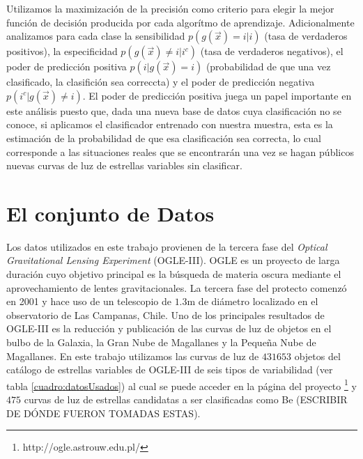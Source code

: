 \documentclass[letterpaper,12pt]{book}
\begin{document}
Utilizamos la maximización de la precisión como criterio para elegir la mejor función de decisión producida por cada algorítmo de aprendizaje. Adicionalmente analizamos para cada clase la sensibilidad $p(g(\vec{x})=i|i)$ (tasa de verdaderos positivos),  la especificidad $p(g(\vec{x})\neq i|i^c)$ (tasa de verdaderos negativos), el poder de predicción positiva $p(i|g(\vec{x})=i)$ (probabilidad de que una vez clasificado, la clasifición sea correccta) y el poder de predicción negativa $p(i^c|g(\vec{x})\neq i)$. El poder de predicción positiva juega un papel importante en este análisis puesto que, dada una nueva base de datos cuya clasificación no se conoce, si aplicamos el clasificador entrenado con nuestra muestra, esta es la estimación de la probabilidad de que esa clasificación sea correcta, lo cual corresponde a las situaciones reales que se encontrarán una vez se hagan públicos nuevas curvas de luz de estrellas variables sin clasificar. 




\section{El conjunto de Datos\label{cap:losDatos}}

Los datos utilizados en este trabajo provienen de la tercera fase del \textit{Optical Gravitational Lensing Experiment} (OGLE-III). OGLE es un proyecto de larga duración cuyo objetivo principal es  la búsqueda de materia oscura mediante el aprovechamiento de lentes gravitacionales. La tercera fase del protecto comenzó en 2001 y hace uso de un telescopio de $1.3$m de diámetro localizado en el observatorio de Las Campanas, Chile\cite{udalski_optical_2004}. Uno de los principales resultados de OGLE-III es la reducción y publicación \cite{udalski_optical_2008} de las curvas de luz de objetos en el bulbo de la Galaxia, la Gran Nube de Magallanes y la Pequeña Nube de Magallanes. En este trabajo utilizamos las curvas de luz de $431 653$ objetos del catálogo de estrellas variables de OGLE-III de seis tipos de variabilidad (ver tabla \ref{cuadro:datosUsados}) al cual se puede acceder en la página del proyecto \footnote{http://ogle.astrouw.edu.pl/} y $475$ curvas de luz de estrellas candidatas a ser clasificadas como Be (ESCRIBIR DE DÓNDE FUERON TOMADAS ESTAS).
\end{document}
